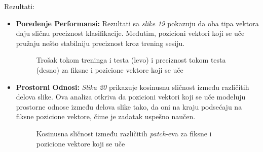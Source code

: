 \documentclass[12pt]{article}
\begin{document}
   Rezultati:
   \begin{itemize}
      \item \textbf{Poređenje Performansi:}  Rezultati sa \textit{slike 19} pokazuju da oba tipa vektora 
      daju sličnu preciznost klasifikacije. Međutim, pozicioni vektori koji se uče 
      pružaju nešto stabilniju preciznost kroz trening sesiju.
      \begin{figure}[h!]
         \centering
         \vspace{1cm} %
         \caption{Trošak tokom treninga i testa (levo) i preciznost tokom testa (desno) za fiksne i pozicione vektore koji se uče}
         \label{fig:exp1_metr}
      \end{figure}

      \newpage
      \item \textbf{Prostorni Odnosi:} \textit{Slika 20} prikazuje 
      kosinusnu sličnost između različitih delova slike. Ova analiza otkriva da 
      pozicioni vektori koji se uče modeluju prostorne odnose između delova slike tako,
      da oni na kraju podsećaju na fiksne pozicione vektore, čime je zadatak uspešno naučen.
      \begin{figure}[h!]
         \centering
         \vspace{1cm} %
         \caption{Kosinusna sličnost između različitih \textit{patch}-eva za fiksne i pozicione vektore koji se uče}
         \label{fig:exp1_cos_sim}
      \end{figure}
   \end{itemize}
   \newpage
\end{document}
